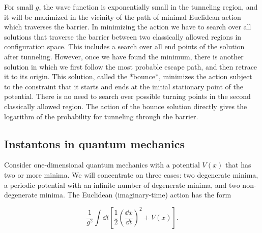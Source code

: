 For small $g$, the wave function is exponentially small in the tunneling region,
and it will be maximized in the vicinity of the path of minimal Euclidean action
which traverses the barrier. In minimizing the action we have to search over all
solutions that traverse the barrier between two classically allowed regions in
configuration space. This includes a search over all end points of the solution
after tunneling. However, once we have found the minimum, there is another
solution in which we first follow the most probable escape path, and then retrace
it to its origin. This solution, called the *bounce*, minimizes the action subject
to the constraint that it starts and ends at the initial stationary point of the
potential. There is no need to search over possible turning points in the second
classically allowed region. The action of the bounce solution directly gives the
logarithm of the probability for tunneling through the barrier.

\subsection{Instantons in quantum mechanics}

Consider one-dimensional quantum mechanics with a potential $V(x)$ that has two
or more minima. We will concentrate on three cases: two degenerate minima, a
periodic potential with an infinite number of degenerate minima, and two
non-degenerate minima. The Euclidean (imaginary-time) action has the form

\[
  \frac{1}{g^2}\int\!\dd t\left[\frac{1}{2}
  \left(\frac{\dd x}{\dd t}\right)^2+V(x)\right].
\]
